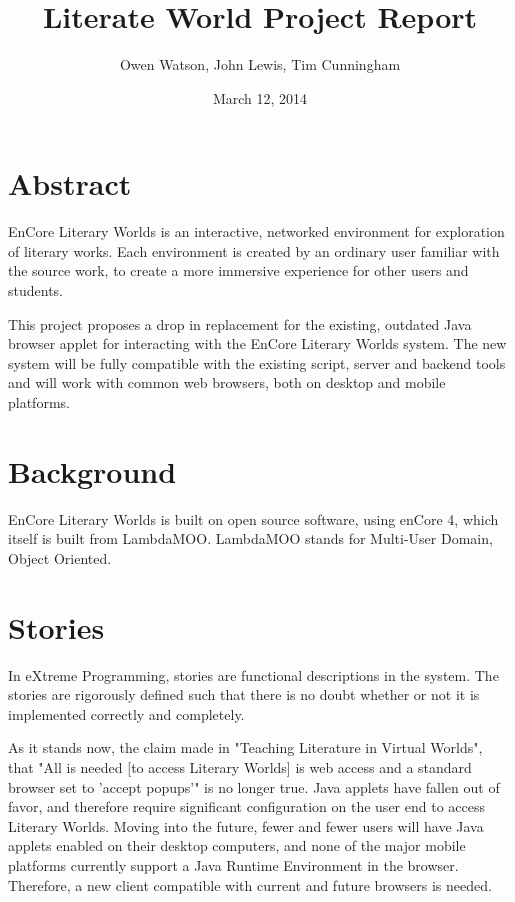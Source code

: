 \documentclass[12pt, letterpaper]{report}
\author{Owen Watson, John Lewis, Tim Cunningham}
\title{Literate World Project Report}
\date{March 12, 2014}
\begin{document}
	\begin{titlepage}
	\Huge \maketitle \par
	\end{titlepage}
	
	\chapter{Abstract}
	\par
	EnCore Literary Worlds is an interactive, networked environment for exploration of literary works. Each environment is created by an ordinary user familiar with the source work, to create a more immersive experience for other users and students.
	
	\par
	This project proposes a drop in replacement for the existing, outdated Java browser applet for interacting with the EnCore Literary Worlds system. The new system will be fully compatible with the existing script, server and backend tools and will work with common web browsers, both on desktop and mobile platforms.
	
	\tableofcontents
	
	\chapter{Background}
	\par
	EnCore Literary Worlds is built on open source software, using enCore 4, which itself is built from LambdaMOO. LambdaMOO stands for Multi-User Domain, Object Oriented.
	
	
	\chapter{Stories}
	\par
	In eXtreme Programming, stories are functional descriptions in the system. The stories are rigorously defined such that there is no doubt whether or not it is implemented correctly and completely.
	
	\par
	As it stands now, the claim made in "Teaching Literature in Virtual Worlds", that "All is needed [to access Literary Worlds] is web access and a standard browser set to 'accept popups'" is no longer true. Java applets have fallen out of favor, and therefore require significant configuration on the user end to access Literary Worlds. Moving into the future, fewer and fewer users will have Java applets enabled on their desktop computers, and none of the major mobile platforms currently support a Java Runtime Environment in the browser. Therefore, a new client compatible with current and future browsers is needed.
	
\end{document}
